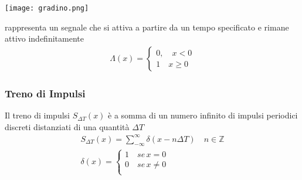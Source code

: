     \begin{minipage}{.4\textwidth}
        \begin{center}
           \texttt{[image: gradino.png]}
        \end{center}
    \end{minipage}
    \begin{minipage}{.5\textwidth}
        rappresenta un segnale che si attiva a partire da un tempo specificato e rimane attivo indefinitamente
        \begin{align*}
            \Lambda(x)=\begin{cases}
                0, \quad x<0\\
                1\quad x\geq0
            \end{cases}
        \end{align*}
    \end{minipage}
    
    \noindent
    \subsubsection{Treno di Impulsi}
    
    \begin{minipage}{.5\textwidth}
        Il treno di impulsi $S_{\Delta T}(x)$ è a somma di un numero infinito di impulsi periodici discreti distanziati di una quantità $\Delta T$
        \begin{align*}
            S_{\Delta T}(x)=\sum_{-\infty}^{\infty}    \delta(x-n\Delta T) \quad n\in\mathbb{Z}\\
            \delta(x)=\begin{cases}
            1\quad se \, x=0\\
            0 \quad se \, x\neq 0\\
            \end{cases}
        \end{align*}
    \end{minipage}
    \begin{minipage}{.4\textwidth}
        \begin{center}
        \end{center}
    \end{minipage}
